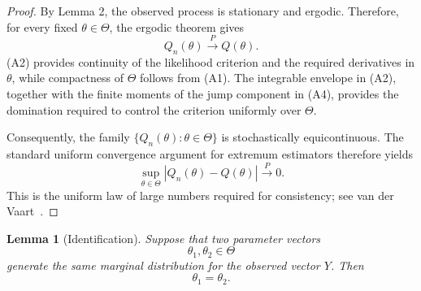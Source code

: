 \documentclass[a4paper,11pt]{amsart}
\newtheorem{lemma}{Lemma}
\theoremstyle{definition}
\theoremstyle{plain}
\theoremstyle{remark}
\newcommand{\1}{\mathbf{1}}
\begin{document}
\begin{proof}
By Lemma 2, the observed process is stationary and ergodic. Therefore, for every fixed $\theta\in\Theta$, the ergodic theorem gives
$$
Q_n(\theta)
\xrightarrow{P}
Q(\theta).
$$
(A2) provides continuity of the likelihood criterion and the required derivatives in $\theta$, while compactness of $\Theta$ follows from (A1). The integrable envelope in (A2), together with the finite moments of the jump component in (A4), provides the domination required to control the criterion uniformly over $\Theta$.

Consequently, the family
$
\{Q_n(\theta):\theta\in\Theta\}
$
is stochastically equicontinuous. The standard uniform convergence argument for extremum estimators therefore yields
$$
\sup_{\theta\in\Theta}
|Q_n(\theta)-Q(\theta)|
\xrightarrow{P}0.
$$
This is the uniform law of large numbers required for consistency; see van der Vaart~\cite{VanDerVaart2000}.
\end{proof}

\begin{lemma}[Identification]
Suppose that two parameter vectors
$$
\theta_1,\theta_2\in\Theta
$$
generate the same marginal distribution for the observed vector $Y$. Then
$$
\theta_1=\theta_2.
$$
\end{lemma}
\end{document}
